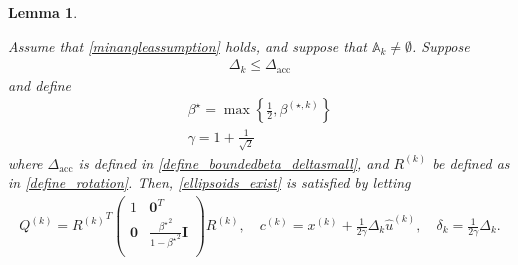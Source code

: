 \documentclass{article}
\newtheorem{lemma}[theorem]{Lemma}
\theoremstyle{case}
\newcommand{\activeconstraintsk}{{\mathbb A_{k}}}
\newcommand{\bs}{{\beta^{\star}}}
\newcommand{\bsk}{{\beta^{(\star, k)}}}
\newcommand{\ck}{{c^{(k)}}}
\newcommand{\dacc}{{\Delta_{\text{acc}}}}
\newcommand{\dk}{\Delta_k}
\newcommand{\huk}{{{\hat u}^{(k)}}}
\newcommand{\qk}{{Q^{(k)}}}
\newcommand{\rotk}{{R^{(k)}}}
\newcommand{\sdk}{{\delta_k}}
\newcommand{\xk}{{x^{(k)}}}
\begin{document}
\begin{lemma}
\label{ellsoid_is_suitable_theorem_p2}

Assume that \cref{minangleassumption} holds, and suppose that $\activeconstraintsk \ne \emptyset$.
Suppose
\begin{align}
\dk \le \dacc\label{accuracy_small_delta}
\end{align}
and define
\begin{align}
\bs = \max\left\{\frac 1 2, \bsk\right\} \label{define_bs} \\
\gamma = 1 + \frac 1 {\sqrt 2}
\end{align}
where $\dacc$ is defined in \cref{define_boundedbeta_deltasmall}, and $\rotk$ be defined as in \cref{define_rotation}.
Then, \cref{ellipsoids_exist} is satisfied by letting
\begin{align*}
\qk = \rotk^T \begin{pmatrix}
1 & \boldsymbol0^T \\
\boldsymbol 0 & \frac{\bs^2}{1 - \bs^2} \boldsymbol I \\
\end{pmatrix} \rotk, \quad
\ck = \xk  + \frac 1 {2\gamma} \dk\huk, \quad
\sdk = \frac 1 {2\gamma} \dk.
\end{align*}
\end{lemma}
\end{document}
